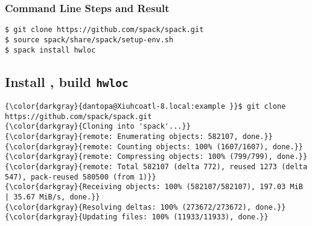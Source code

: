 \documentclass[10pt, oneside]{article}   	%
\begin{document}
\subsubsection{Command Line Steps and Result}
\begin{verbatim}
$ git clone https://github.com/spack/spack.git
$ source spack/share/spack/setup-env.sh
$ spack install hwloc
\end{verbatim}

\subsection{Install \spack, build \texttt{hwloc}}
{\scriptsize{
\begin{Verbatim}[commandchars=\\\{\}]
{\color{darkgray}{dantopa@Xiuhcoatl-8.local:example }}$ git clone https://github.com/spack/spack.git
{\color{darkgray}{Cloning into 'spack'...}}
{\color{darkgray}{remote: Enumerating objects: 582107, done.}}
{\color{darkgray}{remote: Counting objects: 100% (1607/1607), done.}}
{\color{darkgray}{remote: Compressing objects: 100% (799/799), done.}}
{\color{darkgray}{remote: Total 582107 (delta 772), reused 1273 (delta 547), pack-reused 580500 (from 1)}}
{\color{darkgray}{Receiving objects: 100% (582107/582107), 197.03 MiB | 35.67 MiB/s, done.}}
{\color{darkgray}{Resolving deltas: 100% (273672/273672), done.}}
{\color{darkgray}{Updating files: 100% (11933/11933), done.}}


\end{Verbatim}}}
\end{document}
